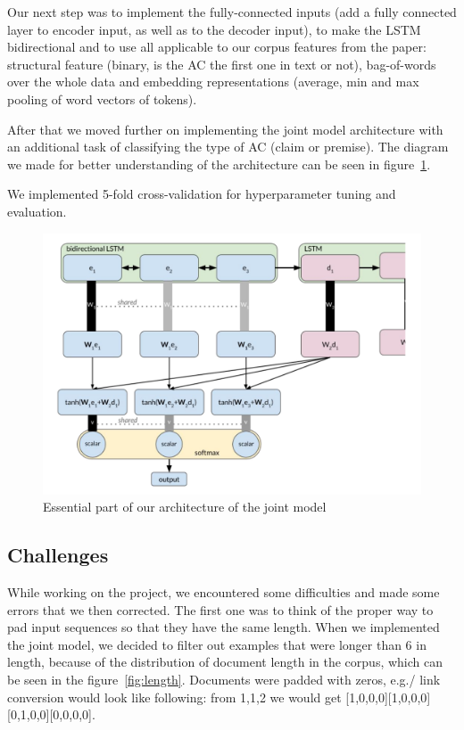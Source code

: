 \documentclass[onecolumn]{article}
\begin{document}
Our next step was to implement the fully-connected inputs (add a fully connected layer to encoder input,
as well as to the decoder input), to make the LSTM bidirectional and to use all applicable to our corpus features from the paper: structural feature
(binary, is the AC the first one in text or not), bag-of-words over the whole data and embedding representations (average, min and max pooling
of word vectors of tokens).

After that we moved further on implementing the joint model architecture with an additional task of classifying the type of AC (claim or premise).
The diagram we made for better understanding of the architecture can be seen in figure~\ref{fig:our-model}.

We implemented 5-fold cross-validation for hyperparameter tuning and evaluation.
\begin{figure}[h]
    \centering
    \includegraphics[width=0.8\linewidth]{fig/architecture.png}
    \caption{Essential part of our architecture of the joint model}\label{fig:our-model}
\end{figure}

\subsection{Challenges}
While working on the project, we encountered some difficulties and made some errors that we then corrected. The first one
was to think of the proper way to pad input sequences so that they have the same length. When we implemented the joint model,
we decided to filter out examples that were longer than 6 in length, because of the distribution of document length in the corpus, which
can be seen in the figure~\ref{fig:length}. Documents were padded with zeros, e.g./ link conversion would look like following:
from 1,1,2 we would get [1,0,0,0][1,0,0,0][0,1,0,0][0,0,0,0].
\end{document}
